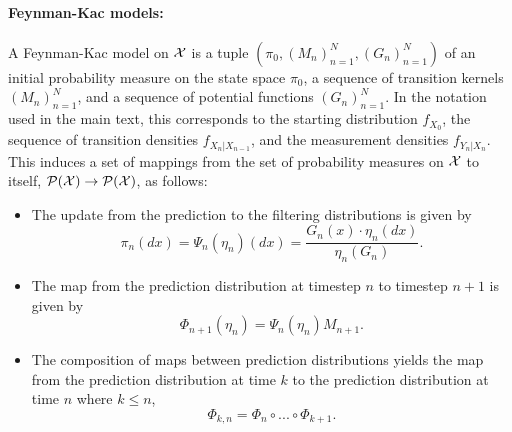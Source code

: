 \paragraph{Feynman-Kac models:} A Feynman-Kac model on ${\mathcal{X}}$ is a tuple $(\pi_0, (M_n)_{n=1}^N, (G_n)_{n=1}^N)$ of an initial probability measure on the state space $\pi_0$, a sequence of transition kernels $(M_n)_{n=1}^N$, and a sequence of potential functions $(G_n)_{n=1}^N$. In the notation used in the main text, this corresponds to the starting distribution $f_{X_0}$, the sequence of transition densities $f_{X_{n}|X_{n-1}}$, and the measurement densities $f_{Y_n|X_n}$. This induces a set of mappings from the set of probability measures on ${\mathcal{X}}$ to itself, $\mathcal{P}({\mathcal{X}}) \to \mathcal{P}({\mathcal{X}})$, as follows:
\begin{itemize}
    \item The update from the prediction to the filtering distributions is given by 
    \begin{equation}
    \pi_n(dx) = \Psi_n(\eta_n)(dx) = \frac{G_n(x)\cdot\eta_n(dx)}{\eta_n(G_n)}.
    \end{equation}
    \item The map from the prediction distribution at timestep $n$ to timestep $n+1$ is given by 
    \begin{equation}
 \Phi_{n+1}(\eta_n) = \Psi_n(\eta_n) M_{n+1}.       
    \end{equation}
    \item The composition of maps between prediction distributions yields the map from the prediction distribution at time $k$ to the prediction distribution at time $n$ where $k \leq n$,
    \begin{equation}
 \Phi_{k,n} = \Phi_n \circ ... \circ \Phi_{k+1}.       
    \end{equation}
\end{itemize}
